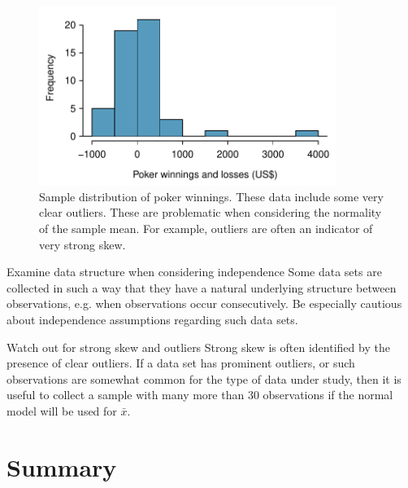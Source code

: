 \begin{spacing}{1.5}
\begin{figure}[ht]
   \centering
   \includegraphics[height=58mm]{ch_inference_foundations_oi_biostat/figures/pokerProfitsCanApplyNormalToSampMean/pokerProfitsCanApplyNormalToSampMean}
   \caption{Sample distribution of poker winnings. These data include some very clear outliers. These are problematic when considering the normality of the sample mean. For example, outliers are often an indicator of very strong skew.}
   \label{pokerProfitsCanApplyNormalToSampMean}
\end{figure}

\begin{caution}
{Examine data structure when considering independence}
{Some data sets are collected in such a way that they have a natural underlying structure between observations, e.g. when observations occur consecutively. Be especially cautious about independence assumptions regarding such data sets.}
\end{caution}

\begin{caution}{Watch out for strong skew and outliers}
{Strong skew is often identified by the presence of clear outliers. If a data set has prominent outliers, or such observations are somewhat common for the type of data under study, then it is useful to collect a sample with many more than 30 observations if the normal model will be used for $\bar{x}$.}
\end{caution}


\section[Summary]{Summary}
\label{ch4Summary}


\end{spacing}
